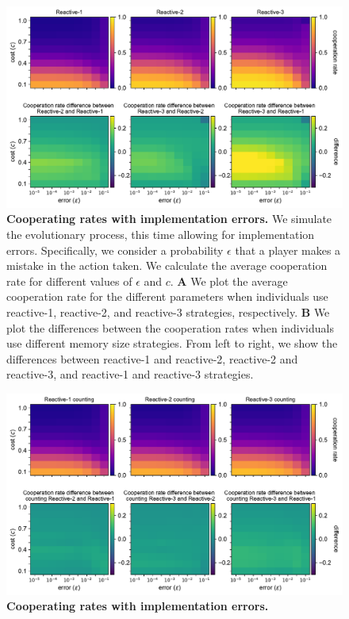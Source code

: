 \documentclass[11pt]{article}
\theoremstyle{plainCl1}
\theoremstyle{plainCl2}
\begin{document}
\begin{figure}[t]
    \centering
    \includegraphics[width=\textwidth]{../../figures/siFig2Errors.pdf}
    \caption{
    \textbf{Cooperating rates with implementation errors.}
We simulate the evolutionary process, this time allowing for implementation
errors. Specifically, we consider a probability \(\epsilon\) that a player makes a mistake
in the action taken. We calculate the average cooperation rate for different
values of \(\epsilon\) and \(c\).
{\bf A} We plot the average cooperation rate for the different parameters when
individuals use reactive-1, reactive-2, and reactive-3 strategies, respectively.
{\bf B} We plot the differences between the cooperation rates when individuals use
different memory size strategies. From left to right, we show the differences
between reactive-1 and reactive-2, reactive-2 and reactive-3, and reactive-1 and
reactive-3 strategies.
    }\label{fig:errors}
\end{figure}

\begin{figure}[h]
  \centering
  \includegraphics[width=\textwidth]{../../figures/siFigErrorsCounting.pdf}
  \caption{
  \textbf{Cooperating rates with implementation errors.}}
\end{figure}
\end{document}
